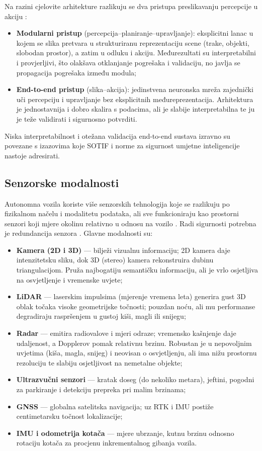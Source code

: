 Na razini cjelovite arhitekture razlikuju se dva pristupa preslikavanju percepcije u akciju \cite{suligoj2025percepcija2}:
\begin{itemize}
  \item \textbf{Modularni pristup} (percepcija--planiranje--upravljanje): eksplicitni lanac u kojem se slika pretvara u strukturiranu reprezentaciju scene (trake, objekti, slobodan prostor), a zatim u odluku i akciju. Međurezultati su interpretabilni i provjerljivi, što olakšava otklanjanje pogrešaka i validaciju, no javlja se propagacija pogrešaka između modula;
  \item \textbf{End-to-end pristup} (slika--akcija): jedinstvena neuronska mreža zajednički uči percepciju i upravljanje bez eksplicitnih međureprezentacija. Arhitektura je jednostavnija i dobro skalira s podacima, ali je slabije interpretabilna te ju je teže validirati i sigurnosno potvrditi.
\end{itemize}
Niska interpretabilnost i otežana validacija end-to-end sustava izravno su povezane s izazovima koje SOTIF i norme za sigurnost umjetne inteligencije nastoje adresirati.

\subsection{Senzorske modalnosti}

Autonomna vozila koriste više senzorskih tehnologija koje se razlikuju po fizikalnom načelu i modalitetu podataka, ali sve funkcioniraju kao prostorni senzori koji mjere okolinu relativno u odnosu na vozilo \cite{suligoj2025percepcija1}. Radi sigurnosti potrebna je redundancija senzora \cite{hrgetic2025uvod}. Glavne modalnosti su:

\begin{itemize}
  \item \textbf{Kamera (2D i 3D)} — bilježi vizualnu informaciju; 2D kamera daje intenzitetsku sliku, dok 3D (stereo) kamera rekonstruira dubinu triangulacijom. Pruža najbogatiju semantičku informaciju, ali je vrlo osjetljiva na osvjetljenje i vremenske uvjete;
  \item \textbf{LiDAR} — laserskim impulsima (mjerenje vremena leta) generira gust 3D oblak točaka visoke geometrijske točnosti; pouzdan noću, ali mu performanse degradiraju raspršenjem u gustoj kiši, magli ili snijegu;
  \item \textbf{Radar} — emitira radiovalove i mjeri odraze; vremensko kašnjenje daje udaljenost, a Dopplerov pomak relativnu brzinu. Robustan je u nepovoljnim uvjetima (kiša, magla, snijeg) i neovisan o osvjetljenju, ali ima nižu prostornu rezoluciju te slabiju osjetljivost na nemetalne objekte;
  \item \textbf{Ultrazvučni senzori} — kratak doseg (do nekoliko metara), jeftini, pogodni za parkiranje i detekciju prepreka pri malim brzinama;
  \item \textbf{GNSS} — globalna satelitska navigacija; uz RTK i IMU postiže centimetarsku točnost lokalizacije;
  \item \textbf{IMU i odometrija kotača} — mjere ubrzanje, kutnu brzinu odnosno rotaciju kotača za procjenu inkrementalnog gibanja vozila.
\end{itemize}

